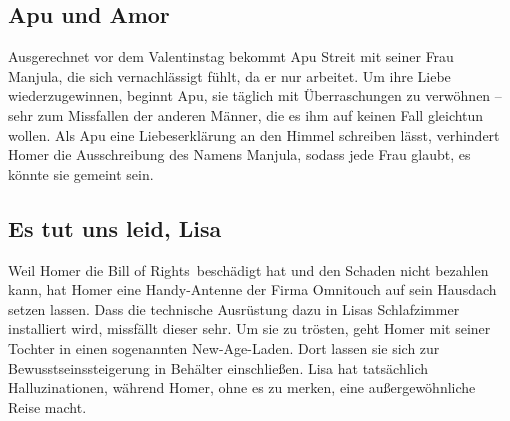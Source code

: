 \subsection{Apu und Amor}\label{AABF11}
Ausgerechnet vor dem Valentinstag bekommt Apu Streit mit seiner Frau Manjula, die sich vernachlässigt fühlt, da er nur arbeitet. Um ihre Liebe wiederzugewinnen, beginnt Apu, sie täglich mit Überraschungen zu verwöhnen -- sehr zum Missfallen der anderen Männer, die es ihm auf keinen Fall gleichtun wollen. Als Apu eine Liebeserklärung an den Himmel schreiben lässt, verhindert Homer die Ausschreibung des Namens Manjula, sodass jede Frau glaubt, es könnte sie gemeint sein.


	
\subsection{Es tut uns leid, Lisa}
Weil Homer die \glqq Bill of Rights\grqq\ beschädigt hat und den Schaden nicht bezahlen kann, hat Homer eine Handy-Antenne der Firma Omnitouch auf sein Hausdach setzen lassen. Dass die technische Ausrüstung dazu in Lisas Schlafzimmer installiert wird, missfällt dieser sehr. Um sie zu trösten, geht Homer mit seiner Tochter in einen sogenannten New-Age-Laden. Dort lassen sie sich zur Bewusstseinssteigerung in Behälter einschließen. Lisa hat tatsächlich Halluzinationen, während Homer, ohne es zu merken, eine außergewöhnliche Reise macht.

